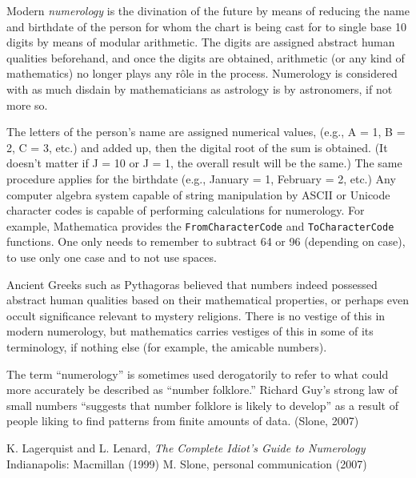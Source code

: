 \documentclass[12pt]{article}
\begin{document}
Modern {\em numerology} is the divination of the future by means of reducing the name and birthdate of the person for whom the chart is being cast for to single base 10 digits by means of modular arithmetic. The digits are assigned abstract human qualities beforehand, and once the digits are obtained, arithmetic (or any kind of mathematics) no longer plays any r\^ole in the process. Numerology is considered with as much disdain by mathematicians as astrology is by astronomers, if not more so.

The letters of the person's name are assigned numerical values, (e.g., A = 1, B = 2, C = 3, etc.) and added up, then the digital root of the sum is obtained. (It doesn't matter if J = 10 or J = 1, the overall result will be the same.) The same procedure applies for the birthdate (e.g., January = 1, February = 2, etc.) Any computer algebra system capable of string manipulation by ASCII or Unicode character codes is capable of performing calculations for numerology. For example, Mathematica provides the \verb=FromCharacterCode= and \verb=ToCharacterCode= functions. One only needs to remember to subtract 64 or 96 (depending on case), to use only one case and to not use spaces.

Ancient Greeks such as Pythagoras believed that numbers indeed possessed abstract human qualities based on their mathematical properties, or perhaps even occult significance relevant to mystery religions. There is no vestige of this in modern numerology, but mathematics carries vestiges of this in some of its terminology, if nothing else (for example, the amicable numbers).

The term ``numerology'' is sometimes used derogatorily to refer to what could more accurately be described as ``number folklore.'' Richard Guy's strong law of small numbers ``suggests that number folklore is likely to develop'' as a result of people liking to find patterns from finite amounts of data. (Slone, 2007)

\begin{thebibliography}{6}
 K. Lagerquist and L. Lenard, {\it The Complete Idiot's Guide to Numerology} Indianapolis: Macmillan (1999)
 M. Slone, personal communication (2007)
\end{thebibliography}
\end{document}
